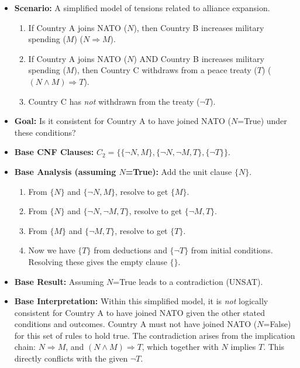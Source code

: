 \documentclass[11pt, a4paper]{article}
\begin{document}
\begin{itemize}
    \item \textbf{Scenario:} A simplified model of tensions related to alliance expansion.
    \begin{enumerate}
        \item If Country A joins NATO ($N$), then Country B increases military spending ($M$) ($N \Rightarrow M$).
        \item If Country A joins NATO ($N$) AND Country B increases military spending ($M$), then Country C withdraws from a peace treaty ($T$) ($(N \wedge M) \Rightarrow T$).
        \item Country C has \textit{not} withdrawn from the treaty ($\neg T$).
    \end{enumerate}
    \item \textbf{Goal:} Is it consistent for Country A to have joined NATO ($N$=True) under these conditions?
    \item \textbf{Base CNF Clauses:} $C_2 = \{\{\neg N, M\}, \{\neg N, \neg M, T\}, \{\neg T\}\}$.
    \item \textbf{Base Analysis (assuming $N$=True):} Add the unit clause $\{N\}$.
    \begin{enumerate}
        \item From $\{N\}$ and $\{\neg N, M\}$, resolve to get $\{M\}$.
        \item From $\{N\}$ and $\{\neg N, \neg M, T\}$, resolve to get $\{\neg M, T\}$.
        \item From $\{M\}$ and $\{\neg M, T\}$, resolve to get $\{T\}$.
        \item Now we have $\{T\}$ from deductions and $\{\neg T\}$ from initial conditions. Resolving these gives the empty clause $\{\}$.
    \end{enumerate}
    \item \textbf{Base Result:} Assuming $N$=True leads to a contradiction (UNSAT).
    \item \textbf{Base Interpretation:} Within this simplified model, it is \textit{not} logically consistent for Country A to have joined NATO given the other stated conditions and outcomes. Country A must not have joined NATO ($N$=False) for this set of rules to hold true. The contradiction arises from the implication chain: $N \Rightarrow M$, and $(N \wedge M) \Rightarrow T$, which together with $N$ implies $T$. This directly conflicts with the given $\neg T$.


\end{itemize}
\end{document}
